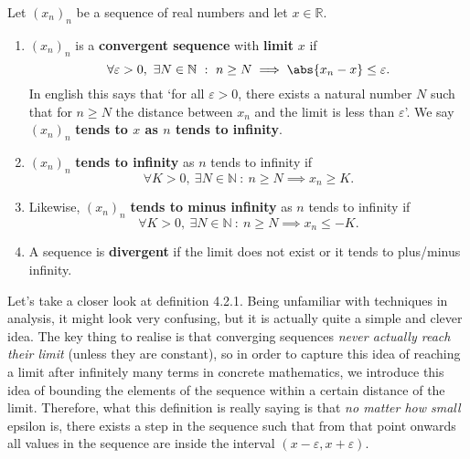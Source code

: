 \documentclass[../real_analysis.tex]{subfiles}
\begin{document}
        \begin{definition}
            Let $(x_n)_n$ be a sequence of real numbers and let $x\in\mathbb{R}$.
            \begin{enumerate}
                \item $(x_n)_n$ is a \textbf{convergent sequence} with \textbf{limit} $x$ if
                \begin{equation*}
                    \forall\varepsilon>0,\ \exists N\in\mathbb{N}\ :\ n\geq N\implies\abs{x_n-x}\leq\varepsilon.
                \end{equation*}
                In english this says that `for all $\varepsilon>0$, there exists a natural number $N$ such that for $n\geq N$ the distance between $x_n$ and the limit is less than $\varepsilon$'. We say $(x_n)_n$ \textbf{tends to $x$ as $n$ tends to infinity}.
                \item $(x_n)_n$ \textbf{tends to infinity} as $n$ tends to infinity if
                \begin{equation*}
                    \forall K>0,\ \exists N\in\mathbb{N}\ :\ n\geq N\implies x_n\geq K.
                \end{equation*}
                \item Likewise, $(x_n)_n$ \textbf{tends to minus infinity} as $n$ tends to infinity if
                \begin{equation*}
                    \forall K>0,\ \exists N\in\mathbb{N}\ :\ n\geq N\implies x_n\leq -K.
                \end{equation*}
                \item A sequence is \textbf{divergent} if the limit does not exist or it tends to plus/minus infinity.
            \end{enumerate}
        \end{definition}
        Let's take a closer look at definition 4.2.1. Being unfamiliar with techniques in analysis, it might look very confusing, but it is actually quite a simple and clever idea. The key thing to realise is that converging sequences \textit{never actually reach their limit} (unless they are constant), so in order to capture this idea of reaching a limit after infinitely many terms in concrete mathematics, we introduce this idea of bounding the elements of the sequence within a certain distance of the limit. Therefore, what this definition is really saying is that \textit{no matter how small} epsilon is, there exists a step in the sequence such that from that point onwards all values in the sequence are inside the interval $(x-\varepsilon,x+\varepsilon)$.
\end{document}
